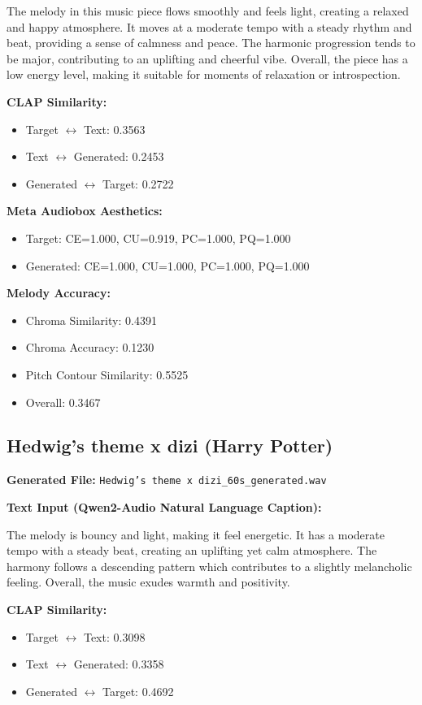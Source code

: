 \documentclass{article}
\begin{document}
\begin{CJK}{UTF8}{bsmi}
\small
The melody in this music piece flows smoothly and feels light, creating a relaxed and happy atmosphere. It moves at a moderate tempo with a steady rhythm and beat, providing a sense of calmness and peace. The harmonic progression tends to be major, contributing to an uplifting and cheerful vibe. Overall, the piece has a low energy level, making it suitable for moments of relaxation or introspection.
\normalsize

\textbf{CLAP Similarity:}
\begin{itemize}
    \item Target $\leftrightarrow$ Text: 0.3563
    \item Text $\leftrightarrow$ Generated: 0.2453
    \item Generated $\leftrightarrow$ Target: 0.2722
\end{itemize}

\textbf{Meta Audiobox Aesthetics:}
\begin{itemize}
    \item Target: CE=1.000, CU=0.919, PC=1.000, PQ=1.000
    \item Generated: CE=1.000, CU=1.000, PC=1.000, PQ=1.000
\end{itemize}

\textbf{Melody Accuracy:}
\begin{itemize}
    \item Chroma Similarity: 0.4391
    \item Chroma Accuracy: 0.1230
    \item Pitch Contour Similarity: 0.5525
    \item Overall: 0.3467
\end{itemize}

\subsection{Hedwig's theme x dizi (Harry Potter)}

\textbf{Generated File:} \texttt{Hedwig's theme x dizi\_60s\_generated.wav}

\textbf{Text Input (Qwen2-Audio Natural Language Caption):}

\small
The melody is bouncy and light, making it feel energetic. It has a moderate tempo with a steady beat, creating an uplifting yet calm atmosphere. The harmony follows a descending pattern which contributes to a slightly melancholic feeling. Overall, the music exudes warmth and positivity.
\normalsize

\textbf{CLAP Similarity:}
\begin{itemize}
    \item Target $\leftrightarrow$ Text: 0.3098
    \item Text $\leftrightarrow$ Generated: 0.3358
    \item Generated $\leftrightarrow$ Target: 0.4692
\end{itemize}


\end{CJK}
\end{document}

